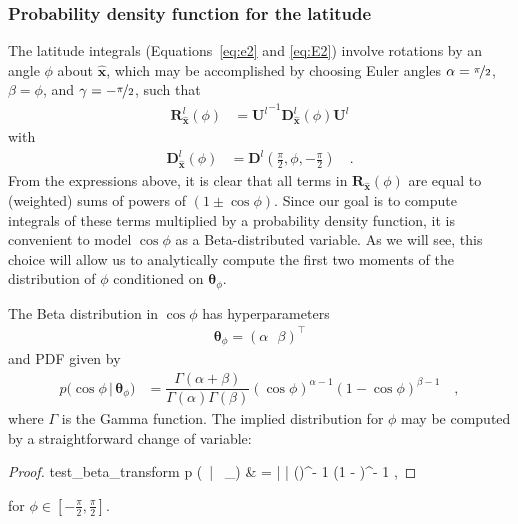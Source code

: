 \documentclass[modern]{aastex62}
\begin{document}
\subsubsection{Probability density function for the latitude}
%
The latitude integrals (Equations~\ref{eq:e2} and \ref{eq:E2}) involve
rotations by an angle $\phi$ about $\hat{\mathbf{x}}$, which
may be accomplished by choosing
Euler angles $\alpha = \nicefrac{\pi}{2}$, $\beta = \phi$, and
$\gamma = -\nicefrac{\pi}{2}$, such that
%
\begin{align}
    \mathbf{R}^l_{\hat{\mathbf{x}}}(\phi)
     & =
    {\mathbf{U}^l}^{-1} \mathbf{D}^l_{\hat{\mathbf{x}}}(\phi) \mathbf{U}^l
\end{align}
%
with
\begin{align}
    \mathbf{D}^l_{\hat{\mathbf{x}}}(\phi)
     & =
    \mathbf{D}^l\left(\frac{\pi}{2}, \phi, -\frac{\pi}{2}\right)
    \quad.
\end{align}
%
From the expressions above, it is clear that all terms in
$\mathbf{R}_{\hat{\mathbf{x}}}(\phi)$ are equal to (weighted) sums of powers
of $(1 \pm \cos\phi)$.
%
Since our goal is to compute integrals of these terms multiplied by
a probability density function, it is convenient to model
$\cos\phi$ as a Beta-distributed variable. As we will see, this
choice will allow us to
analytically compute the first two moments of the distribution of
$\phi$ conditioned on $\pmb{\theta}_\phi$.

%
The Beta distribution in $\cos\phi$ has hyperparameters
%
\begin{align}
    \pmb{\theta}_\phi = \left(
    \alpha \, \, \, \,
    \beta \right)^\top
\end{align}
%
and PDF given by
%
\begin{align}
    \label{eq:cosphi-pdf}
    p \big(\cos\phi \, \big| \, \pmb{\theta}_\phi \big)
     & =
    \dfrac{\Gamma(\alpha + \beta)}{\Gamma(\alpha)\Gamma(\beta)}
    (\cos\phi)^{\alpha - 1}
    (1 - \cos\phi)^{\beta - 1}
    \quad,
\end{align}
%
where $\Gamma$ is the Gamma function. The implied distribution for $\phi$
may be computed by a straightforward change of variable:
%
\begin{proof}{test_beta_transform}
    \label{eq:phi-pdf}
    p \big(\phi \, \big| \, \pmb{\theta}_\phi \big)
    & =
    \dfrac{\Gamma(\alpha + \beta)}{2\Gamma(\alpha)\Gamma(\beta)}
    \big|
    \sin\phi
    \big|
    (\cos\phi)^{\alpha - 1}
    (1 - \cos\phi)^{\beta - 1}
    \quad,
\end{proof}
%
for $\phi \in \left[ -\frac{\pi}{2}, \frac{\pi}{2} \right]$.
\end{document}
